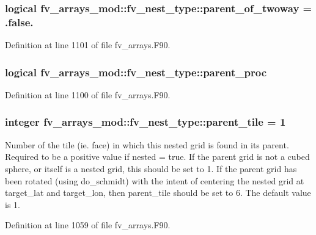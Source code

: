 \subsubsection[{parent\-\_\-of\-\_\-twoway}]{\setlength{\rightskip}{0pt plus 5cm}logical fv\-\_\-arrays\-\_\-mod\-::fv\-\_\-nest\-\_\-type\-::parent\-\_\-of\-\_\-twoway = .false.}\label{structfv__arrays__mod_1_1fv__nest__type_ad429837e6b04316f1a24ee0cdca2ea6a}


Definition at line 1101 of file fv\-\_\-arrays.\-F90.

\subsubsection[{parent\-\_\-proc}]{\setlength{\rightskip}{0pt plus 5cm}logical fv\-\_\-arrays\-\_\-mod\-::fv\-\_\-nest\-\_\-type\-::parent\-\_\-proc}\label{structfv__arrays__mod_1_1fv__nest__type_aee5b7faaaea5ce7126d4a750aac0dd65}


Definition at line 1100 of file fv\-\_\-arrays.\-F90.

\subsubsection[{parent\-\_\-tile}]{\setlength{\rightskip}{0pt plus 5cm}integer fv\-\_\-arrays\-\_\-mod\-::fv\-\_\-nest\-\_\-type\-::parent\-\_\-tile = 1}\label{structfv__arrays__mod_1_1fv__nest__type_aede3093421924ff4358cb95c28007329}


Number of the tile (ie. face) in which this nested grid is found in its parent. Required to be a positive value if nested = true. If the parent grid is not a cubed sphere, or itself is a nested grid, this should be set to 1. If the parent grid has been rotated (using do\-\_\-schmidt) with the intent of centering the nested grid at target\-\_\-lat and target\-\_\-lon, then parent\-\_\-tile should be set to 6. The default value is 1. 



Definition at line 1059 of file fv\-\_\-arrays.\-F90.


